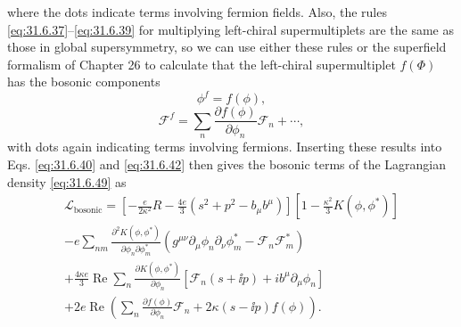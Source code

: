 where the dots indicate terms involving fermion fields. Also, the rules
\eqref{eq:31.6.37}--\eqref{eq:31.6.39} for multiplying left-chiral
supermultiplets are the same as those in global supersymmetry, so we can
use either these rules or the superfield formalism of Chapter 26 to
calculate that the left-chiral supermultiplet \(f(\Phi)\) has the
bosonic components
\begin{equation}
  \phi^f=f(\phi),
  \tag{31.6.55}\label{eq:31.6.55}
\end{equation}
\begin{equation}
  \mathcal F^f
  =\sum_n\frac{\partial f(\phi)}{\partial\phi_n}\mathcal F_n+\cdots,
  \tag{31.6.56}\label{eq:31.6.56}
\end{equation}
with dots again indicating terms involving fermions. Inserting these
results into Eqs. \eqref{eq:31.6.40} and \eqref{eq:31.6.42} then gives
the bosonic terms of the Lagrangian density \eqref{eq:31.6.49} as
\begin{multline}
  \mathcal L_{\mathrm{bosonic}}
  =\left[
    -\frac{e}{2\kappa^2}R
    -\frac{4e}{3}(s^2+p^2-b_\mu b^\mu)
  \right]
  \left[1-\frac{\kappa^2}{3}K(\phi,\phi^*)\right]\\
  -e\sum_{nm}
    \frac{\partial^2K(\phi,\phi^*)}
         {\partial\phi_n\partial\phi_m^*}
    \left(
      g^{\mu\nu}\partial_\mu\phi_n\partial_\nu\phi_m^*
      -\mathcal F_n\mathcal F_m^*
    \right)\\
  +\frac{4\kappa e}{3}\operatorname{Re}\sum_n
    \frac{\partial K(\phi,\phi^*)}{\partial\phi_n}
    \left[
      \mathcal F_n(s+\ii p)+ib^\mu\partial_\mu\phi_n
    \right]\\
  +2e\operatorname{Re}\left(
    \sum_n\frac{\partial f(\phi)}{\partial\phi_n}\mathcal F_n
    +2\kappa(s-\ii p)f(\phi)
  \right).
  \tag{31.6.57}\label{eq:31.6.57}
\end{multline}

